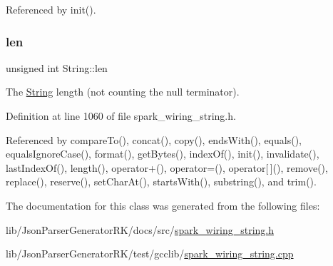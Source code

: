 Referenced by init().

\mbox{\label{class_string_add7c3370b556b8fd8c669b8c6b40043a}} 
\subsubsection{\texorpdfstring{len}{len}}
{\footnotesize\ttfamily unsigned int String\+::len\hspace{0.3cm}{\ttfamily [protected]}}



The \hyperlink{class_string}{String} length (not counting the null terminator). 



Definition at line 1060 of file spark\+\_\+wiring\+\_\+string.\+h.



Referenced by compare\+To(), concat(), copy(), ends\+With(), equals(), equals\+Ignore\+Case(), format(), get\+Bytes(), index\+Of(), init(), invalidate(), last\+Index\+Of(), length(), operator+(), operator=(), operator\mbox{[}$\,$\mbox{]}(), remove(), replace(), reserve(), set\+Char\+At(), starts\+With(), substring(), and trim().



The documentation for this class was generated from the following files\+:\begin{DoxyCompactItemize}
\item 
lib/\+Json\+Parser\+Generator\+R\+K/docs/src/\hyperlink{docs_2src_2spark__wiring__string_8h}{spark\+\_\+wiring\+\_\+string.\+h}\item 
lib/\+Json\+Parser\+Generator\+R\+K/test/gcclib/\hyperlink{spark__wiring__string_8cpp}{spark\+\_\+wiring\+\_\+string.\+cpp}\end{DoxyCompactItemize}
